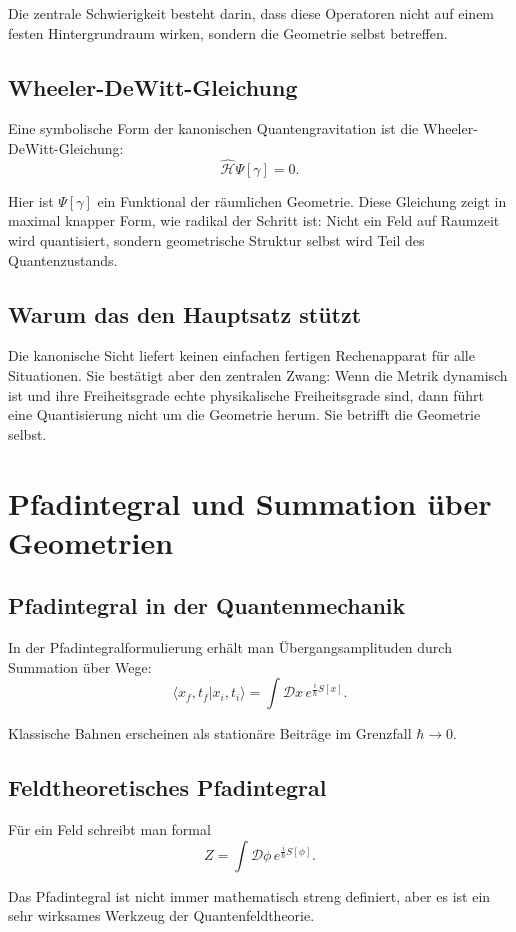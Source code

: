\documentclass[11pt,a4paper,oneside]{book}
\theoremstyle{definition}
\theoremstyle{plain}
\theoremstyle{remark}
\begin{document}
Die zentrale Schwierigkeit besteht darin, dass diese Operatoren nicht auf einem festen Hintergrundraum wirken, sondern die Geometrie selbst betreffen.

\section{Wheeler-DeWitt-Gleichung}
Eine symbolische Form der kanonischen Quantengravitation ist die Wheeler-DeWitt-Gleichung:
\[
\hat{\mathcal{H}}\Psi[\gamma]=0.
\]

Hier ist $\Psi[\gamma]$ ein Funktional der räumlichen Geometrie. Diese Gleichung zeigt in maximal knapper Form, wie radikal der Schritt ist: Nicht ein Feld auf Raumzeit wird quantisiert, sondern geometrische Struktur selbst wird Teil des Quantenzustands.

\section{Warum das den Hauptsatz stützt}
Die kanonische Sicht liefert keinen einfachen fertigen Rechenapparat für alle Situationen. Sie bestätigt aber den zentralen Zwang: Wenn die Metrik dynamisch ist und ihre Freiheitsgrade echte physikalische Freiheitsgrade sind, dann führt eine Quantisierung nicht um die Geometrie herum. Sie betrifft die Geometrie selbst.

\chapter{Pfadintegral und Summation über Geometrien}
\section{Pfadintegral in der Quantenmechanik}
In der Pfadintegralformulierung erhält man Übergangsamplituden durch Summation über Wege:
\[
\langle x_f,t_f|x_i,t_i\rangle=\int \mathcal{D}x\,e^{\frac{i}{\hbar}S[x]}.
\]

Klassische Bahnen erscheinen als stationäre Beiträge im Grenzfall $\hbar\to 0$.

\section{Feldtheoretisches Pfadintegral}
Für ein Feld schreibt man formal
\[
Z=\int \mathcal{D}\phi\,e^{\frac{i}{\hbar}S[\phi]}.
\]

Das Pfadintegral ist nicht immer mathematisch streng definiert, aber es ist ein sehr wirksames Werkzeug der Quantenfeldtheorie.
\end{document}
